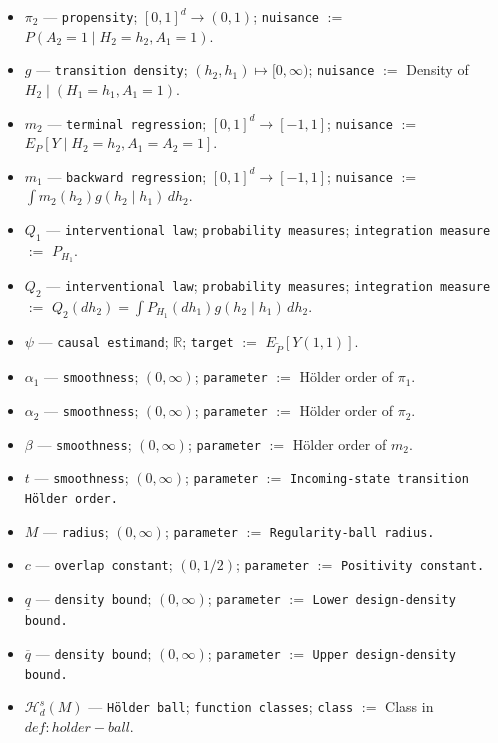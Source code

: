 \documentclass{article}
\begin{document}
\begin{itemize}
  \item \(\pi_2\) --- \texttt{propensity}; \([0,1]^d\to(0,1)\); \texttt{nuisance} $:=$ \(P(A_2=1\mid H_2=h_2,A_1=1)\).
  \item \(g\) --- \texttt{transition density}; \((h_2,h_1)\mapsto[0,\infty)\); \texttt{nuisance} $:=$ Density of \(H_2\mid(H_1=h_1,A_1=1)\).
  \item \(m_2\) --- \texttt{terminal regression}; \([0,1]^d\to[-1,1]\); \texttt{nuisance} $:=$ \(E_P[Y\mid H_2=h_2,A_1=A_2=1]\).
  \item \(m_1\) --- \texttt{backward regression}; \([0,1]^d\to[-1,1]\); \texttt{nuisance} $:=$ \(\int m_2(h_2)g(h_2\mid h_1)\,dh_2\).
  \item \(Q_1\) --- \texttt{interventional law}; \texttt{probability measures}; \texttt{integration measure} $:=$ \(P_{H_1}\).
  \item \(Q_2\) --- \texttt{interventional law}; \texttt{probability measures}; \texttt{integration measure} $:=$ \(Q_2(dh_2)=\int P_{H_1}(dh_1)g(h_2\mid h_1)\,dh_2\).
  \item \(\psi\) --- \texttt{causal estimand}; \(\mathbb R\); \texttt{target} $:=$ \(E_{\widetilde P}[Y(1,1)]\).
  \item \(\alpha_1\) --- \texttt{smoothness}; \((0,\infty)\); \texttt{parameter} $:=$ Hölder order of \(\pi_1\).
  \item \(\alpha_2\) --- \texttt{smoothness}; \((0,\infty)\); \texttt{parameter} $:=$ Hölder order of \(\pi_2\).
  \item \(\beta\) --- \texttt{smoothness}; \((0,\infty)\); \texttt{parameter} $:=$ Hölder order of \(m_2\).
  \item \(t\) --- \texttt{smoothness}; \((0,\infty)\); \texttt{parameter} $:=$ \texttt{Incoming-state transition Hölder order.}
  \item \(M\) --- \texttt{radius}; \((0,\infty)\); \texttt{parameter} $:=$ \texttt{Regularity-ball radius.}
  \item \(c\) --- \texttt{overlap constant}; \((0,1/2)\); \texttt{parameter} $:=$ \texttt{Positivity constant.}
  \item \(\underline q\) --- \texttt{density bound}; \((0,\infty)\); \texttt{parameter} $:=$ \texttt{Lower design-density bound.}
  \item \(\overline q\) --- \texttt{density bound}; \((0,\infty)\); \texttt{parameter} $:=$ \texttt{Upper design-density bound.}
  \item \(\mathcal H_d^s(M)\) --- \texttt{Hölder ball}; \texttt{function classes}; \texttt{class} $:=$ Class in \(def:holder-ball\).

\end{itemize}
\end{document}
